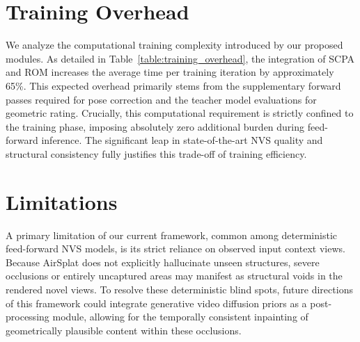 \begin{table}[t]
\begin{center}
    \scriptsize
    \caption{Pose-free point map estimation on 7-Scenes~\cite{6619221} dataset.}
    
\label{table:mv_recon}
\end{center}
\end{table}





\section{Training Overhead}
\label{sec:supp_training_overhead}

\begin{table}[t]
\begin{center}
    \scriptsize
    \caption{Training time analysis. We report the average time per training iteration. While our proposed modules (SCPA and ROM) introduce additional forward passes and teacher model evaluations, the overall training remains tractable.}
    \resizebox{0.6\linewidth}{!}{ 
        
    }
\label{table:training_overhead}
\end{center}
\end{table}

We analyze the computational training complexity introduced by our proposed modules. As detailed in Table~\ref{table:training_overhead}, the integration of SCPA and ROM increases the average time per training iteration by approximately 65\%. 
This expected overhead primarily stems from the supplementary forward passes required for pose correction and the teacher model evaluations for geometric rating. 
Crucially, this computational requirement is strictly confined to the training phase, imposing absolutely zero additional burden during feed-forward inference. The significant leap in state-of-the-art NVS quality and structural consistency fully justifies this trade-off of training efficiency.


\section{Limitations}
\label{sec:supp_limitations}
 A primary limitation of our current framework, common among deterministic feed-forward NVS models, is its strict reliance on observed input context views. Because AirSplat does not explicitly hallucinate unseen structures, severe occlusions or entirely uncaptured areas may manifest as structural voids in the rendered novel views. To resolve these deterministic blind spots, future directions of this framework could integrate generative video diffusion priors as a post-processing module, allowing for the temporally consistent inpainting of geometrically plausible content within these occlusions.

